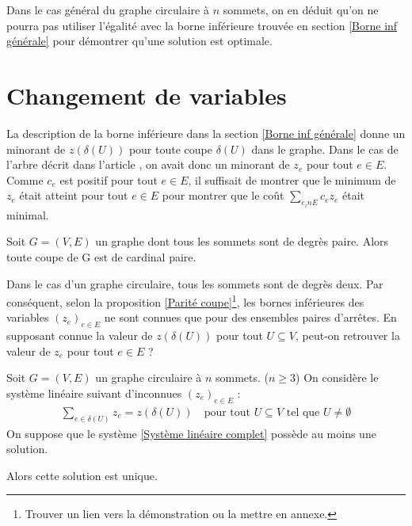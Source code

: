 \documentclass[twoside,11pt,openany,a4paper]{rapport}
\begin{document}
Dans le cas général du graphe circulaire à $n$ sommets, on en déduit qu'on ne pourra pas utiliser l'égalité avec la borne inférieure trouvée en section \ref{Borne inf générale} pour démontrer qu'une solution est optimale.

\section{Changement de variables}
\label{Changement variables}

La description de la borne inférieure dans la section \ref{Borne inf générale} donne un minorant de $z(\delta(U))$ pour toute coupe $\delta(U)$ dans le graphe. Dans le cas de l'arbre décrit dans l'article \cite{Benchimol2011}, on avait donc un minorant de $z_e$ pour tout $e \in E$. Comme $c_e$ est positif pour tout $e\in E$, il suffisait de montrer que le minimum de $z_e$ était atteint pour tout $e \in E$ pour montrer que le coût $\sum_{e _in E}c_ez_e$ était minimal.

\begin{prop}\label{Parité coupe}
Soit $G=(V,E)$ un graphe dont tous les sommets sont de degrès paire. Alors toute coupe de G est de cardinal paire.
\end{prop}

Dans le cas d'un graphe circulaire, tous les sommets sont de degrès deux. Par conséquent, selon la proposition \ref{Parité coupe}\footnote{Trouver un lien vers la démonstration ou la mettre en annexe.}, les bornes inférieures des variables $(z_e)_{e \in E}$ ne sont connues que pour des ensembles paires d'arrêtes. En supposant connue la valeur de $z(\delta(U))$ pour tout $U \subseteq V$, peut-on retrouver la valeur de $z_e$ pour tout $e \in E$ ?

\begin{lem}\label{Changement de base}
Soit $G=(V,E)$ un graphe circulaire à $n$ sommets. ($n \ge 3$)
On considère le système linéaire suivant d'inconnues $(z_e)_{e \in E}$ :
\begin{gather}\label{Système linéaire complet}
  \sum_{e \in \delta(U)}z_e = z(\delta(U)) \quad \mbox{pour tout } U \subseteq V \mbox{ tel que } U \ne \emptyset
\end{gather}
On suppose que le système \ref{Système linéaire complet} possède au moins une solution.

Alors cette solution est unique.
\end{lem}
\end{document}
